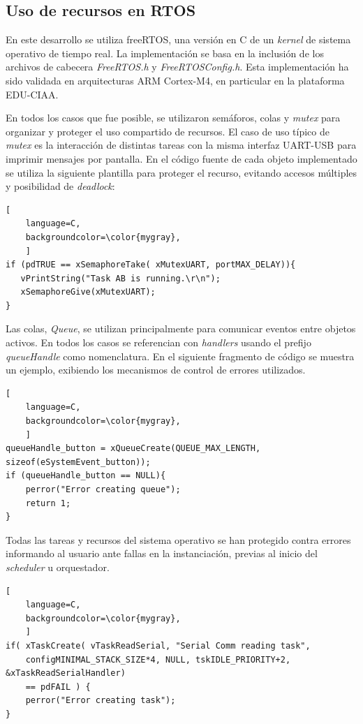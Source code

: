 \subsection{Uso de recursos en RTOS}

En este desarrollo se utiliza freeRTOS, una versión en C de un \textit{kernel} de sistema operativo de tiempo real. La implementación se basa en la inclusión de los archivos de cabecera \textit{FreeRTOS.h} y \textit{FreeRTOSConfig.h}. Esta implementación ha sido validada en arquitecturas ARM Cortex-M4, en particular en la plataforma EDU-CIAA. 

En todos los casos que fue posible, se utilizaron semáforos, colas y \textit{mutex} para organizar y proteger el uso compartido de recursos. El caso de uso típico de \textit{mutex} es la interacción de distintas tareas con la misma interfaz UART-USB para imprimir mensajes por pantalla. En el código fuente de cada objeto implementado se utiliza la siguiente plantilla para proteger el recurso, evitando accesos múltiples y posibilidad de \textit{deadlock}:\\

\begin{lstlisting}[
	language=C, 
	backgroundcolor=\color{mygray},
	]
if (pdTRUE == xSemaphoreTake( xMutexUART, portMAX_DELAY)){
   vPrintString("Task AB is running.\r\n");
   xSemaphoreGive(xMutexUART);
}
\end{lstlisting}

Las colas, \textit{Queue}, se utilizan principalmente para comunicar eventos entre objetos activos. En todos los casos se referencian con \textit{handlers} usando el prefijo \textit{queueHandle} como nomenclatura. En el siguiente fragmento de código se muestra un ejemplo, exibiendo los mecanismos de control de errores utilizados. \\

\begin{lstlisting}[
	language=C, 
	backgroundcolor=\color{mygray},
	]
queueHandle_button = xQueueCreate(QUEUE_MAX_LENGTH, sizeof(eSystemEvent_button));
if (queueHandle_button == NULL){
    perror("Error creating queue");
    return 1;
}
\end{lstlisting}


Todas las tareas y recursos del sistema operativo se han protegido contra errores informando al usuario ante fallas en la instanciación, previas al inicio del \textit{scheduler} u orquestador.

\begin{lstlisting}[
	language=C, 
	backgroundcolor=\color{mygray},
	]
if( xTaskCreate( vTaskReadSerial, "Serial Comm reading task", 
    configMINIMAL_STACK_SIZE*4, NULL, tskIDLE_PRIORITY+2, &xTaskReadSerialHandler) 
    == pdFAIL ) {
    perror("Error creating task");
}
\end{lstlisting}

